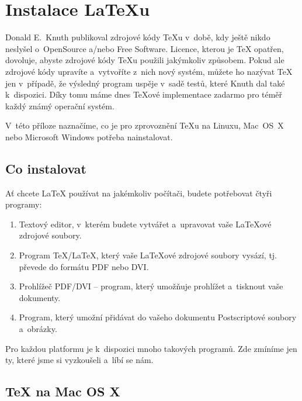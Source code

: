 \appendix
\renewcommand\thechapter{\Alph{chapter}.}
\renewcommand\thesection{\thechapter\arabic{section}.}
\renewcommand\thesubsection{\thesection\arabic{subsection}.}
\chapter{Instalace \LaTeX u}
\begin{intro}
Donald E.~Knuth publikoval zdrojové kódy \TeX u v~době, kdy ještě nikdo neslyšel
o~OpenSource a/nebo Free Software. Licence, kterou je \TeX{} opatřen,
dovoluje, abyste zdrojové kódy \TeX{}u použili jakýmkoliv způsobem. Pokud
ale zdrojové kódy upravíte a~vytvoříte z~nich nový systém, můžete ho nazývat \TeX{} jen
v~případě, že výsledný program uspěje v~sadě testů, které Knuth dal
také k~dispozici. Díky tomu máme dnes \TeX ové implementace zadarmo pro téměř
každý známý operační systém. 

V~této příloze naznačíme, co je pro zprovoznění \TeX u
na Linuxu, Mac~OS~X nebo Microsoft Windows potřeba nainstalovat.
\end{intro}

\section{Co instalovat}

Ať chcete \LaTeX{} používat na jakémkoliv počítači, budete potřebovat
čtyři programy:

\begin{enumerate}

\item Textový editor, v~kterém budete vytvářet a~upravovat vaše \LaTeX ové
zdrojové soubory.

\item Program \TeX{}/\LaTeX{}, který vaše \LaTeX ové zdrojové soubory
vysází, tj. převede do formátu PDF nebo DVI.

\item Prohlížeč PDF/DVI -- program, který umožňuje prohlížet a~tisknout
vaše dokumenty.

\item Program, který umožní přidávat do vašeho dokumentu Postscriptové
soubory a~obrázky.

\end{enumerate}

Pro každou platformu je k~dispozici mnoho takových programů. Zde zmíníme
jen ty, které jsme si vyzkoušeli a~líbí se nám.

\section{\TeX{} na Mac OS X}

